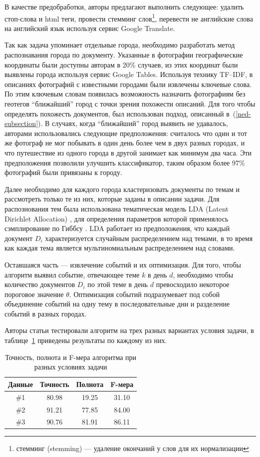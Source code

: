 \documentclass[12pt, a4paper]{article}
\begin{document}
  В качестве предобработки, авторы предлагают выполнить следующее: удалить стоп-слова и html теги, провести стемминг слов\footnote{стемминг (stemming) --- удаление окончаний у слов для их нормализации}, перевести не английские слова на английский язык используя сервис Google Translate.
  
	Так как задача упоминает отдельные города, необходимо разработать метод распознавания города по документу. Указанные в фотографии географические координаты были доступны авторам в 20\% случаев, из этих координат были выявлены города используя сервис Google Tables. Используя технику TF--IDF, в описаниях фотографий с известными городами были извлечены ключевые слова. По этим ключевым словам появилась возможность назначить фотографиям без геотегов ``ближайший'' город с точки зрения похожести описаний. Для того чтобы определять похожесть документов, был использован подход, описанный в~(\ref{ned-subsection}). В случаях, когда ``ближайший'' город выявить не удавалось, авторами использовались следующие предположения: считалось что один и тот же фотограф не мог побывать в один день более чем в двух разных городах, и что путешествие из одного города в другой занимает как минимум два часа. Эти предположения позволили улучшить классификатор, таким образом более 97\% фотографий были привязаны к городу.
	
	Далее необходимо для каждого города кластеризовать документы по темам и рассмотреть только те из них, которые заданы в описании задачи. Для распознования тем была использована тематическая модель LDA (Latent Dirichlet Allocation) \cite{lda-model}, для определения параметров которой применялось сэмплирование по Гиббсу \cite{lda-gibbs}. LDA работает из предположения, что каждый документ $D_i$ характеризуется случайным распределением над темами, в то время как каждая тема является мультиномиальным распределением над словами.
	
	Оставшаяся часть --- извлечение событий и их оптимизация. Для того, чтобы алгоритм выявил событие, отвечающее теме $k$ в день $d$, необходимо чтобы количество документов $D_i$ по этой теме в день $d$ превосходило некоторое пороговое значение $\theta$. Оптимизация событий подразумевает под собой объединение событий на одну тему в последовательные дни и разделение событий в разных городах.
	
	Авторы статьи тестировали алгоритм на трех разных вариантах условия задачи, в таблице~\ref{lda-table} приведены результаты по каждому из них.
	
\begin{table}[h]
	\centering
    \begin{tabular}{c c c c}
    Данные & Точность & Полнота & F-мера \\ \hline
    \#1 & 80.98 & 19.25 & 31.10 \\ 
    \#2 & 91.21 & 77.85 & 84.00  \\ 
    \#3 & 90.76 & 81.91 & 86.11 \\ \hline
    \end{tabular}
    \caption{Точность, полнота и F-мера алгоритма при разных условиях задачи}
    \label{lda-table}
\end{table}
\end{document}
